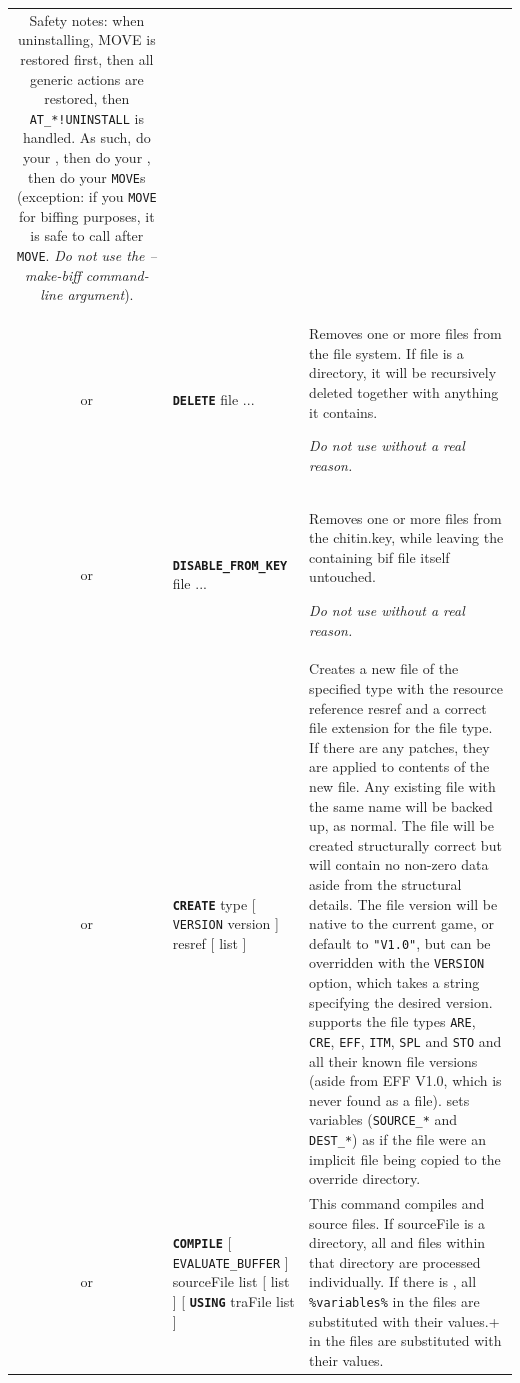 \documentclass{article}
\def\ttref#1{\ahrefloc{#1}{\tt #1}}
\def\DEFINE#1{{\tt \bf #1}\label{#1}\index{#1}}
\def\t#1{{\tt #1}}
\def\Slist{{\color{red} list }}
\def\Ob{{\color{red} [ }}
\def\Oe{{\color{red} ] }}
\begin{document}
\begin{tabular}{cp{10in}|p{10in}}
       Safety notes: when uninstalling, MOVE is restored first,
       then all generic actions are restored, then \t{AT_*!UNINSTALL} is handled.
       As such, do your \ttref{AT_NOW}, then do your \ttref{COPY}, then do your \t{MOVE}s
       (exception: if you \t{MOVE} for biffing purposes, it is safe to call
       \ttref{MAKE_BIFF} after \t{MOVE}. \emph{Do not use the --make-biff command-line argument}).
       \\

  or & \DEFINE{DELETE} \ttref{optNoBackup} file ... &
  Removes one or more files from the file system. If file is a
  directory, it will be recursively deleted together with anything
  it contains.

        \emph{Do not use without a real reason.}
       \\

  or & \DEFINE{DISABLE_FROM_KEY} file ... &
		Removes one or more files from the chitin.key, while leaving the
		containing bif file itself untouched.

		\emph{Do not use without a real reason.}
       \\

  or & \DEFINE{CREATE} type \Ob \t{VERSION} version \Oe resref \Ob \ttref{patch} \Slist \Oe &

      Creates a new file of the specified type with the resource
      reference resref and a correct file extension for the file
      type. If there are any patches, they are applied to contents of
      the new file. Any existing file with the same name will be
      backed up, as normal. The file will be created structurally
      correct but will contain no non-zero data aside from the
      structural details. The file version will be native to the
      current game, or default to \t{"V1.0"}, but can be overridden
      with the \t{VERSION} option, which takes a string specifying the
      desired version. \ttref{CREATE} supports the file types \t{ARE},
      \t{CRE}, \t{EFF}, \t{ITM}, \t{SPL} and \t{STO} and all their
      known file versions (aside from EFF V1.0, which is never found
      as a file). \ttref{CREATE} sets \ttref{COPY} variables
      (\t{SOURCE_*} and \t{DEST_*}) as if the file were an implicit
      file being copied to the override directory. \\

  or & \DEFINE{COMPILE} \Ob \t{EVALUATE_BUFFER} \Oe sourceFile \Slist
       \Ob \ttref{patch} \Slist \Oe \Ob \DEFINE{USING} traFile \Slist \Oe &
      This command compiles \ttref{D} and \ttref{BAF} source files. If
      sourceFile is a directory, all \ttref{D} and \ttref{BAF} files within
      that directory are processed individually. If there is \ttref{EVALUATE_BUFFER},
      all \verb+%variables%+ in the files are substituted with their values.


\end{tabular}
\end{document}
